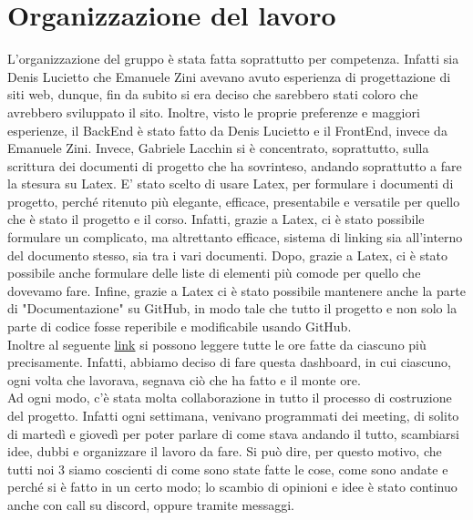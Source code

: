 \documentclass{article}
\begin{document}

\pagebreak

\tableofcontents
\pagebreak

\section{Organizzazione del lavoro}

L'organizzazione del gruppo è stata fatta soprattutto per competenza. Infatti sia Denis Lucietto che Emanuele Zini avevano avuto esperienza di progettazione di siti web, dunque, fin da subito si era deciso che sarebbero stati coloro che avrebbero sviluppato il sito. Inoltre, visto le proprie preferenze e maggiori esperienze, il BackEnd è stato fatto da Denis Lucietto e il FrontEnd, invece da Emanuele Zini. Invece, Gabriele Lacchin si è concentrato, soprattutto, sulla scrittura dei documenti di progetto  che ha sovrinteso, andando soprattutto a fare la stesura su Latex. E' stato scelto di usare Latex, per formulare i documenti di progetto, perché ritenuto più elegante, efficace, presentabile e versatile per quello che è stato il progetto e il corso. Infatti, grazie a Latex, ci è stato possibile formulare un complicato, ma altrettanto efficace, sistema di linking sia all'interno del documento stesso, sia tra i vari documenti.  Dopo, grazie a Latex, ci è stato possibile anche formulare delle liste di elementi più comode per quello che dovevamo fare. Infine, grazie a Latex ci è stato possibile mantenere anche la parte di "Documentazione" su GitHub, in modo tale che tutto il progetto e non solo la parte di codice fosse reperibile e modificabile usando GitHub. \\Inoltre al seguente \href{https://www.notion.so/00afd2533fec4cae9120d119bfb7c9a1?v=332b02dda53744719f961bed09df9116}{link} si possono leggere tutte le ore fatte da ciascuno più precisamente. Infatti, abbiamo deciso di fare questa dashboard, in cui ciascuno, ogni volta che lavorava, segnava ciò che ha fatto e il monte ore.\\
Ad ogni modo, c'è stata molta collaborazione in tutto il processo di costruzione del progetto. Infatti ogni settimana, venivano programmati dei meeting, di solito di martedì e giovedì per poter parlare di come stava andando il tutto, scambiarsi idee, dubbi e organizzare il lavoro da fare. Si può dire, per questo motivo, che tutti noi 3 siamo coscienti di come sono state fatte le cose, come sono andate e perché si è fatto in un certo modo; lo scambio di opinioni e idee è stato continuo anche con call su discord, oppure tramite messaggi.
\newpage
\end{document}
